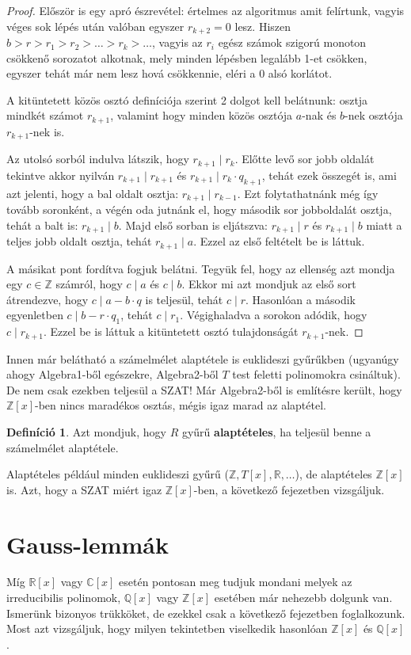\documentclass[12pt]{book}
\theoremstyle{plain} %
\theoremstyle{definition} %
\newtheorem{defi/}{Definíció}[section]
\newenvironment{defi}
  {\renewcommand{\qedsymbol}{$\clubsuit$}%
   \pushQED{\qed}\begin{defi/}}
  {\popQED\end{defi/}}
\theoremstyle{remark}
\renewcommand\qedsymbol{$\blacksquare$}
\numberwithin{equation}{section}  %
\begin{document}
	\begin{proof}
		Először is egy apró észrevétel: értelmes az algoritmus amit felírtunk, vagyis véges sok lépés után valóban egyszer $r_{k+2}=0$ lesz. Hiszen $b>r>r_1>r_2>\ldots > r_{k}> \ldots$, vagyis az $r_i$ egész számok szigorú monoton csökkenő sorozatot alkotnak, mely minden lépésben legalább 1-et csökken, egyszer tehát már nem lesz hová csökkennie, eléri a 0 alsó korlátot.
		
		A kitüntetett közös osztó definíciója szerint 2 dolgot kell belátnunk: osztja mindkét számot $r_{k+1}$, valamint hogy minden közös osztója $a$-nak és $b$-nek osztója $r_{k+1}$-nek is.
		
		Az utolsó sorból indulva látszik, hogy $r_{k+1}\mid r_k$. Előtte levő sor jobb oldalát tekintve akkor nyilván $r_{k+1}\mid r_{k+1}$ és $r_{k+1}\mid r_k\cdot q_{k+1}$, tehát ezek összegét is, ami azt jelenti, hogy a bal oldalt osztja: $r_{k+1}\mid r_{k-1}$. Ezt folytathatnánk még így tovább soronként, a végén oda jutnánk el, hogy második sor jobboldalát osztja, tehát a balt is: $r_{k+1}\mid b$. Majd első sorban is eljátszva: $r_{k+1}\mid r$ és $r_{k+1}\mid b$ miatt a teljes jobb oldalt osztja, tehát $r_{k+1} \mid a$. Ezzel az első feltételt be is láttuk.
		
		A másikat pont fordítva fogjuk belátni. Tegyük fel, hogy az ellenség azt mondja egy $c\in \mathbb{Z}$ számról, hogy $c\mid a$ és $c\mid b$. Ekkor mi azt mondjuk az első sort átrendezve, hogy $c\mid a-b\cdot q$ is teljesül, tehát $c\mid r$. Hasonlóan a második egyenletben $c\mid b-r\cdot q_1$, tehát $c\mid r_1$. Végighaladva a sorokon adódik, hogy $c\mid r_{k+1}$. Ezzel be is láttuk a kitüntetett osztó tulajdonságát $r_{k+1}$-nek.
	\end{proof}
	Innen már belátható a számelmélet alaptétele is euklideszi gyűrűkben (ugyanúgy ahogy Algebra1-ből egészekre, Algebra2-ből $T$ test feletti polinomokra csináltuk). De nem csak ezekben teljesül a SZAT! Már Algebra2-ből is említésre került, hogy $\mathbb{Z}[x]$-ben nincs maradékos osztás, mégis igaz marad az alaptétel.
	\begin{defi}
		Azt mondjuk, hogy $R$ gyűrű \textbf{alaptételes}, ha teljesül benne a számelmélet alaptétele.
	\end{defi}
	Alaptételes például minden euklideszi gyűrű ($\mathbb{Z}, T[x], \mathbb{R}, \ldots$), de alaptételes $\mathbb{Z}[x]$ is. Azt, hogy a SZAT miért igaz $\mathbb{Z}[x]$-ben, a következő fejezetben vizsgáljuk.
	
	
	\section{Gauss-lemmák}
	Míg $\mathbb{R}[x]$ vagy $\mathbb{C}[x]$ esetén pontosan meg tudjuk mondani melyek az irreducibilis polinomok, $\mathbb{Q}[x]$ vagy $\mathbb{Z}[x]$ esetében már nehezebb dolgunk van. Ismerünk bizonyos trükköket, de ezekkel csak a következő fejezetben foglalkozunk. Most azt vizsgáljuk, hogy milyen tekintetben viselkedik hasonlóan $\mathbb{Z}[x]$ és $\mathbb{Q}[x]$.
	
\end{document}
